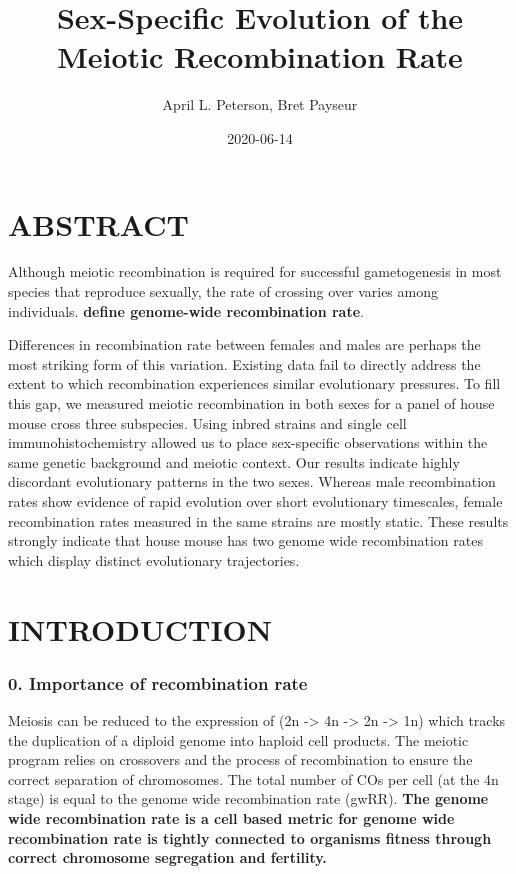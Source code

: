 \documentclass[
]{article}
\title{Sex-Specific Evolution of the Meiotic Recombination Rate}
\author{April L. Peterson, Bret Payseur}
\date{2020-06-14}
\begin{document}
\maketitle

\hypertarget{abstract}{%
\section{ABSTRACT}\label{abstract}}

Although meiotic recombination is required for successful gametogenesis
in most species that reproduce sexually, the rate of crossing over
varies among individuals. \textbf{define genome-wide recombination
rate}.

Differences in recombination rate between females and males are perhaps
the most striking form of this variation. Existing data fail to directly
address the extent to which recombination experiences similar
evolutionary pressures. To fill this gap, we measured meiotic
recombination in both sexes for a panel of house mouse cross three
subspecies. Using inbred strains and single cell immunohistochemistry
allowed us to place sex-specific observations within the same genetic
background and meiotic context. Our results indicate highly discordant
evolutionary patterns in the two sexes. Whereas male recombination rates
show evidence of rapid evolution over short evolutionary timescales,
female recombination rates measured in the same strains are mostly
static. These results strongly indicate that house mouse has two genome
wide recombination rates which display distinct evolutionary
trajectories.

\hypertarget{introduction}{%
\section{INTRODUCTION}\label{introduction}}

\hypertarget{importance-of-recombination-rate}{%
\subsubsection{0. Importance of recombination
rate}\label{importance-of-recombination-rate}}

Meiosis can be reduced to the expression of (2n -\textgreater{} 4n
-\textgreater{} 2n -\textgreater{} 1n) which tracks the duplication of a
diploid genome into haploid cell products. The meiotic program relies on
crossovers and the process of recombination to ensure the correct
separation of chromosomes. The total number of COs per cell (at the 4n
stage) is equal to the genome wide recombination rate (gwRR).
\textbf{The genome wide recombination rate is a cell based metric for
genome wide recombination rate is tightly connected to organisms fitness
through correct chromosome segregation and fertility.}
\end{document}
